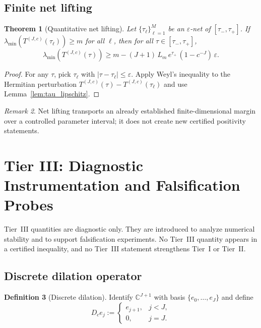 \documentclass[12pt,reqno]{amsart}
\numberwithin{equation}{section}
\newtheorem{theorem}{Theorem}[section]
\theoremstyle{definition}
\newtheorem{definition}[theorem]{Definition}
\theoremstyle{remark}
\newtheorem{remark}[theorem]{Remark}
\newcommand{\CC}{\mathbb{C}}
\begin{document}
\subsection{Finite net lifting}
\begin{theorem}[Quantitative net lifting]
\label{thm:netlift}
Let $\{\tau_\ell\}_{\ell=1}^M$ be an $\varepsilon$-net of $[\tau_-,\tau_+]$.
If $\lambda_{\min}(T^{(J,c)}(\tau_\ell))\ge m$ for all $\ell$, then for all
$\tau\in[\tau_-,\tau_+]$,
\[
\lambda_{\min}(T^{(J,c)}(\tau))
\ge
m-(J+1)\,L_m\,e^{\tau_+}\,(1-c^{-J})\,\varepsilon.
\]
\end{theorem}

\begin{proof}
For any $\tau$, pick $\tau_\ell$ with $|\tau-\tau_\ell|\le\varepsilon$.
Apply Weyl's inequality to the Hermitian perturbation
$T^{(J,c)}(\tau)-T^{(J,c)}(\tau_\ell)$ and use Lemma~\ref{lem:tau_lipschitz}.
\end{proof}

\begin{remark}
Net lifting transports an already established finite-dimensional margin over a
controlled parameter interval; it does not create new certified positivity statements.
\end{remark}

\section{Tier III: Diagnostic Instrumentation and Falsification Probes}
\label{sec:tier3}

Tier~III quantities are diagnostic only. They are introduced to analyze numerical
stability and to support falsification experiments. No Tier~III quantity appears in
a certified inequality, and no Tier~III statement strengthens Tier~I or Tier~II.

\subsection{Discrete dilation operator}
\begin{definition}[Discrete dilation]
\label{def:dilation}
Identify $\CC^{J+1}$ with basis $\{e_0,\dots,e_J\}$ and define
\[
D_c e_j :=
\begin{cases}
e_{j+1}, & j<J,\\
0, & j=J.
\end{cases}
\]
\end{definition}
\end{document}
